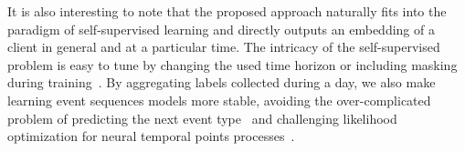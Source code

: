 \documentclass[runningheads]{llncs}
\begin{document}
It is also interesting to note that the proposed approach naturally fits into the paradigm of self-supervised learning and directly outputs an embedding of a client in general and at a particular time. The intricacy of the self-supervised problem is easy to tune by changing the used time horizon or including masking during training~\cite{he2022masked, kenton2019bert}. By aggregating labels collected during a day, we also make learning event sequences models more stable, avoiding the over-complicated problem of predicting the next event type~\cite{babaev2022coles} and challenging likelihood optimization for neural temporal points processes~\cite{shchur2021neural}.






 




\clearpage
\newpage
\end{document}
